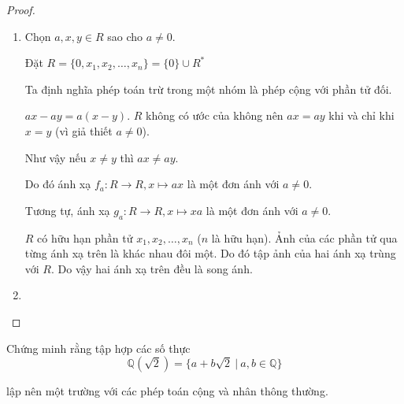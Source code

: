\documentclass[class=linearalgebra,crop=false]{standalone}
\begin{document}
\begin{proof}
    \begin{enumerate}[label = (\alph*)]
        \item Chọn $a, x, y \in R$ sao cho $a\ne 0$.
        \par Đặt $R = \{ 0, x_{1}, x_{2}, \ldots, x_{n} \} = \{ 0 \} \cup R^{*}$
        \par Ta định nghĩa phép toán trừ trong một nhóm là phép cộng với phần tử đối.
        \par $ax - ay = a(x - y)$. $R$ không có ước của không nên $ax = ay$ khi và chỉ khi $x = y$ (vì giả thiết $a\ne 0$).
        \par Như vậy nếu $x\ne y$ thì $ax \ne ay$.
        \par Do đó ánh xạ $f_{a}: R\rightarrow R, x\mapsto ax$ là một đơn ánh với $a\ne 0$.
        \par Tương tự, ánh xạ $g_{a}: R\rightarrow R, x\mapsto xa$ là một đơn ánh với $a\ne 0$.
        \par $R$ có hữu hạn phần tử $x_{1}, x_{2}, \ldots, x_{n}$ ($n$ là hữu hạn). Ảnh của các phần tử qua từng ánh xạ trên là khác nhau đôi một. Do đó tập ảnh của hai ánh xạ trùng với $R$. Do vậy hai ánh xạ trên đều là song ánh.

        \item
    \end{enumerate}
\end{proof}

\begin{exercise}Chứng minh rằng tập hợp các số thực
    \[ \mathbb{Q}(\sqrt{2}) = \{ a + b\sqrt{2}\ |\ a, b\in\mathbb{Q} \} \]
    \par lập nên một trường với các phép toán cộng và nhân thông thường.
\end{exercise}
\end{document}
